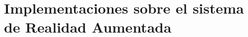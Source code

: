 \documentclass{subfiles}
\begin{document}
  \chapter{Implementaciones sobre el sistema de Realidad Aumentada}
  \label{chap:3}
\end{document}
